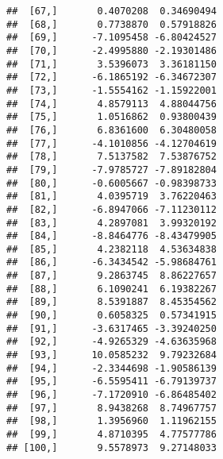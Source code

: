 \documentclass[
]{article}
\begin{document}
\begin{verbatim}
##  [67,]       0.4070208  0.34690494
##  [68,]       0.7738870  0.57918826
##  [69,]      -7.1095458 -6.80424527
##  [70,]      -2.4995880 -2.19301486
##  [71,]       3.5396073  3.36181150
##  [72,]      -6.1865192 -6.34672307
##  [73,]      -1.5554162 -1.15922001
##  [74,]       4.8579113  4.88044756
##  [75,]       1.0516862  0.93800439
##  [76,]       6.8361600  6.30480058
##  [77,]      -4.1010856 -4.12704619
##  [78,]       7.5137582  7.53876752
##  [79,]      -7.9785727 -7.89182804
##  [80,]      -0.6005667 -0.98398733
##  [81,]       4.0395719  3.76220463
##  [82,]      -6.8947066 -7.11230112
##  [83,]       4.2897081  3.99320192
##  [84,]      -8.8464776 -8.43479905
##  [85,]       4.2382118  4.53634838
##  [86,]      -6.3434542 -5.98684761
##  [87,]       9.2863745  8.86227657
##  [88,]       6.1090241  6.19382267
##  [89,]       8.5391887  8.45354562
##  [90,]       0.6058325  0.57341915
##  [91,]      -3.6317465 -3.39240250
##  [92,]      -4.9265329 -4.63635968
##  [93,]      10.0585232  9.79232684
##  [94,]      -2.3344698 -1.90586139
##  [95,]      -6.5595411 -6.79139737
##  [96,]      -7.1720910 -6.86485402
##  [97,]       8.9438268  8.74967757
##  [98,]       1.3956960  1.11962155
##  [99,]       4.8710395  4.77577786
## [100,]       9.5578973  9.27148033
\end{verbatim}
\end{document}
